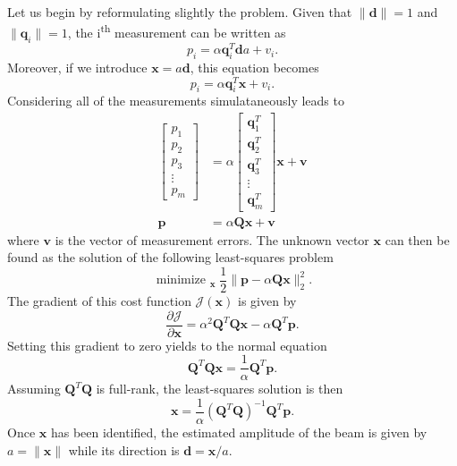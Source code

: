 \documentclass[12pt, answers]{exam}
\DeclareMathOperator*{\minimize}{minimize~}
\begin{document}
\begin{questions}
\begin{parts}
    \begin{solution}
      {\color{blue}
        Let us begin by reformulating slightly the problem.
        Given that $\| \bm{d} \| = 1$ and $\| \bm{q}_i \| = 1$, the i\textsuperscript{th} measurement can be written as
        \[
        p_i = \alpha \bm{q}_i^T \bm{d} a + v_i.
        \]
        Moreover, if we introduce $\bm{x} = a \bm{d}$, this equation becomes
        \[
        p_i = \alpha \bm{q}_i^T \bm{x} + v_i.
        \]
        Considering all of the measurements simulataneously leads to
        \[
        \begin{aligned}
          \begin{bmatrix}
            p_1 \\ p_2 \\ p_3 \\ \vdots \\ p_m
          \end{bmatrix}
          & =
          \alpha
          \begin{bmatrix}
            \bm{q}_1^T \\
            \bm{q}_2^T \\
            \bm{q}_3^T \\
            \vdots \\
            \bm{q}_m^T
          \end{bmatrix}
          \bm{x} + \bm{v} \\
          \bm{p} & = \alpha \bm{Qx} + \bm{v}
        \end{aligned}
        \]
        where $\bm{v}$ is the vector of measurement errors.
        The unknown vector $\bm{x}$ can then be found as the solution of the following least-squares problem
        \[
        \minimize_{\bm{x}} \dfrac{1}{2} \| \bm{p} - \alpha \bm{Qx} \|_2^2.
        \]
        The gradient of this cost function $\mathcal{J}(\bm{x})$ is given by
        \[
        \dfrac{\partial \mathcal{J}}{\partial \bm{x}} = \alpha^2 \bm{Q}^T \bm{Qx} - \alpha \bm{Q}^T\bm{p}.
        \]
        Setting this gradient to zero yields to the normal equation
        \[
        \bm{Q}^T \bm{Qx} = \dfrac{1}{\alpha} \bm{Q}^T \bm{p}.
        \]
        Assuming $\bm{Q}^T \bm{Q}$ is full-rank, the least-squares solution is then
        \[
        \bm{x} = \dfrac{1}{\alpha} \left( \bm{Q}^T \bm{Q} \right)^{-1} \bm{Q}^T \bm{p}.
        \]
        Once $\bm{x}$ has been identified, the estimated amplitude of the beam is given by $a = \| \bm{x} \|$ while its direction is $\bm{d} = \bm{x}/ a$.
      }
    \end{solution}


\end{parts}
\end{questions}
\end{document}
